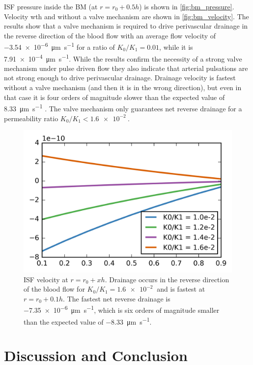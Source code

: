 \documentclass[a4paper,titlepage]{scrartcl}
\begin{document}
ISF pressure inside the BM (at $r = r_0 + 0.5h$) is shown in \autoref{fig:bm_pressure}. Velocity wth and without a valve mechanism are shown in \autoref{fig:bm_velocity}. The results show that a valve mechanism is required to drive perivascular drainage in the reverse direction of the blood flow with an average flow velocity of \SI{-3.54e-6}{\micro\metre\per\second} for a ratio of $K_0/K_1 = 0.01$, while it is \SI{7.91e-4}{\micro\metre\per\second}. While the results confirm the necessity of a strong valve mechanism under pulse driven flow they also indicate that arterial pulsations are not strong enough to drive perivascular drainage. Drainage velocity is fastest without a valve mechanism (and then it is in the wrong direction), but even in that case it is four orders of magnitude slower than the expected value of \SI{8.33}{\micro\metre\per\second} \cite{Carare2008}. The valve mechanism only guarantees net reverse drainage for a permeability ratio $K_0/K_1 < \SI{1.6e-2}{}$.

\begin{figure}
\centerline{\includegraphics{figures/valve_test.png}}
\caption{ISF velocity at $r = r_0 + xh$. Drainage occurs in the reverse direction of the blood flow for $K_0/K_1 = \SI{1.6e-2}{}$ and is fastest at $r = r_0 + 0.1h$. The fastest net reverse drainage is \SI{-7.35e-6}{\micro\metre\per\second}, which is six orders of magnitude smaller than the expected value of \SI{-8.33}{\micro\metre\per\second}.\label{fig:valve_test}}
\end{figure}


\section{Discussion and Conclusion}
\end{document}

